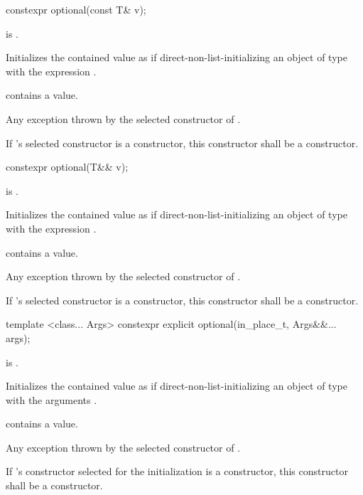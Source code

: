 %
\begin{itemdecl}
constexpr optional(const T& v);
\end{itemdecl}

\begin{itemdescr}
\pnum
\requires
{} is .

\pnum
\effects
Initializes the contained value as if direct-non-list-initializing an object of type  with the expression .

\pnum
\postcondition
{} contains a value.

\pnum
\throws
Any exception thrown by the selected constructor of .

\pnum
\remarks
If 's selected constructor is a  constructor, this constructor shall be a  constructor.
\end{itemdescr}

%
\begin{itemdecl}
constexpr optional(T&& v);
\end{itemdecl}

\begin{itemdescr}
\pnum
\requires
{} is .

\pnum
\effects
Initializes the contained value as if direct-non-list-initializing an object of type  with the expression .

\pnum
\postcondition
{} contains a value.

\pnum
\throws
Any exception thrown by the selected constructor of .

\pnum
\remarks
If 's selected constructor is a  constructor, this constructor shall be a  constructor.
\end{itemdescr}

%
\begin{itemdecl}
template <class... Args> constexpr explicit optional(in_place_t, Args&&... args);
\end{itemdecl}

\begin{itemdescr}
\pnum
\requires
{} is .

\pnum
\effects
Initializes the contained value as if direct-non-list-initializing an object of type  with the arguments .

\pnum
\postcondition
{} contains a value.

\pnum
\throws
Any exception thrown by the selected constructor of .

\pnum
\remarks
If 's constructor selected for the initialization is a  constructor, this constructor shall be a  constructor.
\end{itemdescr}

